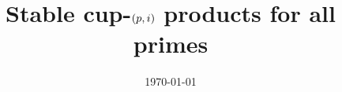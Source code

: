 \documentclass{amsart}
\title{Stable cup-$\lowercase{(p,i)}$ products for all primes}
\date{\today}
\begin{document}
	
	\maketitle
	\tableofcontents
	
	
	
	
	
	
	
	
	
	
%	
%	
	\sloppy
	\printbibliography
\end{document}
